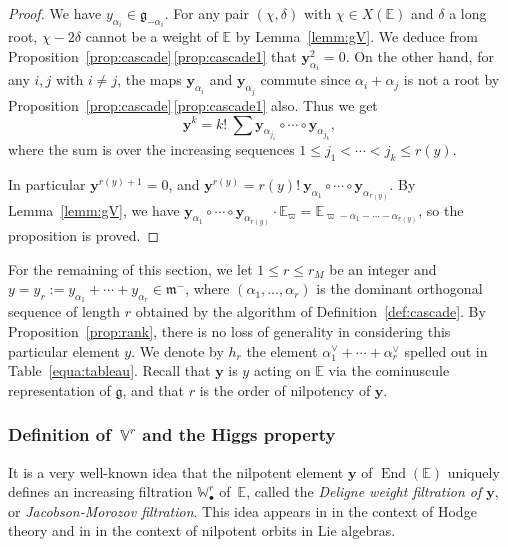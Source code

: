 \documentclass[10pt]{amsart}
\let\oldvee\vee
\renewcommand{\vee}{{\scriptscriptstyle\oldvee}}
\newcommand{\sbullet}{{\scriptscriptstyle\bullet}}
\newcommand{\citestar}[3]{\cite[#3]{#1}}
\theoremstyle{plain}
\theoremstyle{definition}
\let\rgy r
\DeclareMathOperator{\End}{End}
\newcommand{\bE}{\mathbb{E}}
\newcommand{\Vr}{\mathbb{V}^\rgy}
\newcommand{\Wr}{\mathbb{W}^\rgy}
\newcommand{\by}{\boldsymbol{y}}
\newcommand{\fgg}{\mathfrak{g}}
\newcommand{\fm}{\mathfrak{m}}
\newcommand{\rkm}{{r_M}}
\newcommand{\rky}{{r(y)}}
\begin{document}
\begin{proof}
We have $y_{\alpha_i} \in \fgg_{-\alpha_i}$. For any pair $(\chi,\delta)$ with $\chi \in X(\bE)$ and
$\delta$ a long root,
$\chi-2\delta$ cannot be a weight of $\bE$ by Lemma~\ref{lemm:gV}. We deduce from
Proposition~\ref{prop:cascade}\,\eqref{prop:cascade1}
that
$\by_{\alpha_i}^2=0$. On the other hand, for any $i,j$ with $i \neq j$,
the maps $\by_{\alpha_i}$ and $\by_{\alpha_j}$ commute since $\alpha_i + \alpha_j$ is not
a root by Proposition~\ref{prop:cascade}\,\eqref{prop:cascade1} also. Thus we get
$$
\by^k = k!\ \sum \by_{\alpha_{j_1}} \circ \cdots \circ \by_{\alpha_{j_k}},
$$
where the sum is over the increasing sequences $1\leq j_1 < \cdots < j_k \leq \rky$.

In particular $\by^{\rky+1} = 0$, and
$\by^\rky = \rky!\ \by_{\alpha_1} \circ \cdots \circ \by_{\alpha_\rky}$.
By Lemma~\ref{lemm:gV}, we have
$\by_{\alpha_1} \circ \cdots \circ \by_{\alpha_\rky} \cdot \bE_{\varpi} = \bE_{\varpi-\alpha_1-\cdots-\alpha_\rky}$,
so the proposition is proved.
\end{proof}

For the remaining of this section, we let $1\leq \rgy \leq \rkm$ be an integer and $y=y_r:=y_{\alpha_1}+
\cdots + y_{\alpha_\rgy}\in\fm^-$, where
$(\alpha_1,\ldots,\alpha_\rgy)$ is the dominant orthogonal sequence of length $\rgy$ obtained by the
algorithm of Definition~\ref{def:cascade}. By Proposition~\ref{prop:rank}, there is no loss of
generality in considering this particular element $y$.
We denote by
$h_\rgy$ the element
$\alpha_1^\vee + \cdots + \alpha_\rgy^\vee$ spelled out in Table~\ref{equa:tableau}. Recall that $\by$
is $y$ acting on $\bE$ via the cominuscule representation of $\fgg$, and that $r$ is the order
of nilpotency of $\by$.

\subsubsection{Definition of $\,\Vr$ and the Higgs property}

It is a very well-known idea that the nilpotent element $\by$ of $\End(\bE)$ uniquely defines an increasing
filtration $\Wr_\sbullet$ of~$\bE$, called the \emph{Deligne weight filtration of $\by$}, or
\emph{Jacobson-Morozov filtration}. This idea appears in \citestar{deligne}*{.13} in the context of
Hodge theory and in \citestar{mcgovern}*{\S\S3.2\,\&\,3.4} in the context of nilpotent orbits in Lie algebras.
\end{document}
